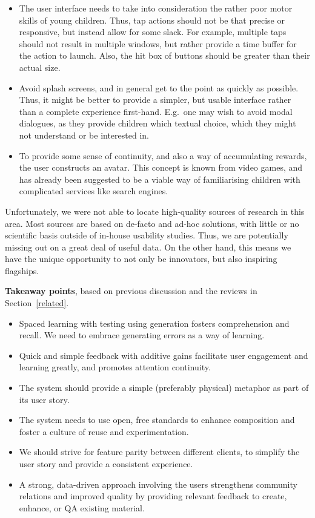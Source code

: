 \begin{itemize}
\item The user interface needs to take into consideration the rather poor motor
skills of young children\cite{kidsquora}. Thus, tap actions should not be that
precise or responsive, but instead allow for some slack. For example, multiple
taps should not result in multiple windows, but rather provide a time buffer for
the action to launch. Also, the hit box of buttons should be greater than their
actual size.
\item Avoid splash screens\cite{kidsluke}, and in general get to the point as 
quickly as
possible. Thus, it might be better to provide a simpler, but usable interface
rather than a complete experience first-hand. E.g.\ one may wish to avoid 
modal dialogues, as they provide children which textual choice, which they
might not understand or be interested in.
\item To provide some sense of continuity, and also a way of accumulating
rewards, the user constructs an avatar. This concept is known from video
games, and has already been suggested to be a viable way of familiarising
children with complicated services like search engines\cite{gossen2012search}.
\end{itemize}

Unfortunately, we were not able to locate high-quality sources of research in
this area. Most sources are based on de-facto and ad-hoc solutions, with little
or no scientific basis outside of in-house usability studies. Thus, we are
potentially missing out on a great deal of useful data. On the other hand, 
this means we have the unique opportunity to not only be innovators, but also 
inspiring flagships.

\textbf{Takeaway points}, based on previous discussion and the reviews in 
Section~\ref{related}.

\begin{itemize}
\item Spaced learning with testing using generation fosters comprehension and
recall. We need to embrace generating errors as a way of learning.
\item Quick and simple feedback with additive gains facilitate user engagement
and learning greatly, and promotes attention continuity.
\item The system should provide a simple (preferably physical) metaphor as part
of its user story.
\item The system needs to use open, free standards to enhance composition and
foster a culture of reuse and experimentation.
\item We should strive for feature parity between different clients, to simplify
the user story and provide a consistent experience.
\item A strong, data-driven approach involving the users strengthens community
relations and improved quality by providing relevant feedback to create,
enhance, or QA existing material.
\end{itemize}

